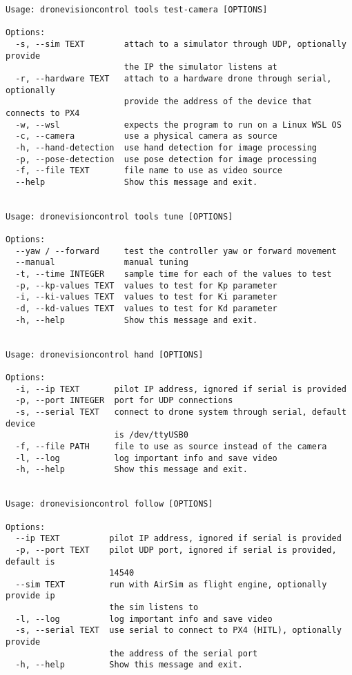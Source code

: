 \begin{verbatim}
Usage: dronevisioncontrol tools test-camera [OPTIONS]

Options:
  -s, --sim TEXT        attach to a simulator through UDP, optionally provide
                        the IP the simulator listens at
  -r, --hardware TEXT   attach to a hardware drone through serial, optionally
                        provide the address of the device that connects to PX4
  -w, --wsl             expects the program to run on a Linux WSL OS
  -c, --camera          use a physical camera as source
  -h, --hand-detection  use hand detection for image processing
  -p, --pose-detection  use pose detection for image processing
  -f, --file TEXT       file name to use as video source
  --help                Show this message and exit.


Usage: dronevisioncontrol tools tune [OPTIONS]

Options:
  --yaw / --forward     test the controller yaw or forward movement
  --manual              manual tuning
  -t, --time INTEGER    sample time for each of the values to test
  -p, --kp-values TEXT  values to test for Kp parameter
  -i, --ki-values TEXT  values to test for Ki parameter
  -d, --kd-values TEXT  values to test for Kd parameter
  -h, --help            Show this message and exit.


Usage: dronevisioncontrol hand [OPTIONS]

Options:
  -i, --ip TEXT       pilot IP address, ignored if serial is provided
  -p, --port INTEGER  port for UDP connections
  -s, --serial TEXT   connect to drone system through serial, default device
                      is /dev/ttyUSB0
  -f, --file PATH     file to use as source instead of the camera
  -l, --log           log important info and save video
  -h, --help          Show this message and exit.


Usage: dronevisioncontrol follow [OPTIONS]

Options:
  --ip TEXT          pilot IP address, ignored if serial is provided
  -p, --port TEXT    pilot UDP port, ignored if serial is provided, default is
                     14540
  --sim TEXT         run with AirSim as flight engine, optionally provide ip
                     the sim listens to
  -l, --log          log important info and save video
  -s, --serial TEXT  use serial to connect to PX4 (HITL), optionally provide
                     the address of the serial port
  -h, --help         Show this message and exit.
\end{verbatim}


